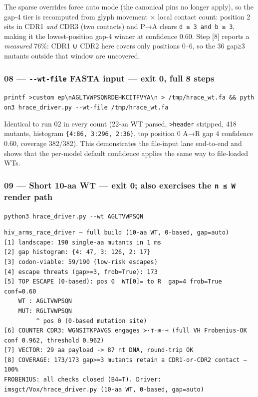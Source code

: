 The sparse overrides force auto mode (the canonical pins no longer
apply), so the gap-4 tier is recomputed from glyph movement × local
contact count: position 2 sits in CDR1 \emph{and} CDR3 (two contacts)
and P→A clears \texttt{d\ ≥\ 3\ and\ b\ ≥\ 3}, making it the
lowest-position gap-4 winner at confidence 0.60. Step {[}8{]} reports a
\emph{measured} 76\%: CDR1 ∪ CDR2 here covers only positions 0--6, so
the 36 gap≥3 mutants outside that window are uncovered.

\hypertarget{wt-file-fasta-input-exit-0-full-8-steps}{%
\subsubsection{\texorpdfstring{08 --- \texttt{-\/-wt-file} FASTA input
--- exit 0, full 8
steps}{08 --- -\/-wt-file FASTA input --- exit 0, full 8 steps}}\label{wt-file-fasta-input-exit-0-full-8-steps}}

\texttt{printf\ \textquotesingle{}\textgreater{}custom\ ep\textbackslash{}nAGLTVWPSQNRDEHKCITFVYA\textbackslash{}n\textquotesingle{}\ \textgreater{}\ /tmp/hrace\_wt.fa\ \&\&\ python3\ hrace\_driver.py\ -\/-wt-file\ /tmp/hrace\_wt.fa}

Identical to run 02 in every count (22-aa WT parsed,
\texttt{\textgreater{}header} stripped, 418 mutants, histogram
\texttt{\{4:86,\ 3:296,\ 2:36\}}, top position 0 A→R gap 4 confidence
0.60, coverage 382/382). This demonstrates the file-input lane
end-to-end and shows that the per-model default confidence applies the
same way to file-loaded WTs.

\hypertarget{short-10-aa-wt-exit-0-also-exercises-the-n-w-render-path}{%
\subsubsection{\texorpdfstring{09 --- Short 10-aa WT --- exit 0; also
exercises the \texttt{n\ ≤\ W} render
path}{09 --- Short 10-aa WT --- exit 0; also exercises the n ≤ W render path}}\label{short-10-aa-wt-exit-0-also-exercises-the-n-w-render-path}}

\texttt{python3\ hrace\_driver.py\ -\/-wt\ AGLTVWPSQN}

\begin{verbatim}
hiv_arms_race_driver — full build (10-aa WT, 0-based, gap=auto)
[1] landscape: 190 single-aa mutants in 1 ms
[2] gap histogram: {4: 47, 3: 126, 2: 17}
[3] codon-viable: 59/190 (low-risk escapes)
[4] escape threats (gap>=3, frob=True): 173
[5] TOP ESCAPE (0-based): pos 0  WT[0]= to R  gap=4 frob=True conf=0.60
    WT : AGLTVWPSQN
    MUT: RGLTVWPSQN
         ^ pos 0 (0-based mutation site)
[6] COUNTER CDR3: WGNSITKPAVGS engages ≻·⊤·⊞·⊣ (full VH Frobenius-OK conf 0.962, threshold 0.962)
[7] VECTOR: 29 aa payload -> 87 nt DNA, round-trip OK
[8] COVERAGE: 173/173 gap>=3 mutants retain a CDR1-or-CDR2 contact — 100%
FROBENIUS: all checks closed (B4=T). Driver: imsgct/Vox/hrace_driver.py (10-aa WT, 0-based, gap=auto)
\end{verbatim}

